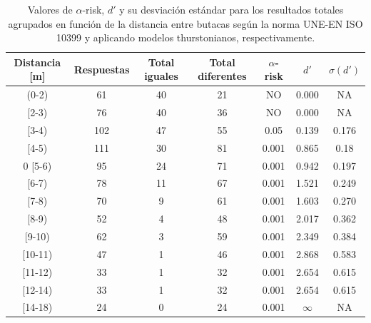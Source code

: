 \documentclass[11pt,a4paper]{book}
\begin{document}
            \begin{table}[H]
			\begin{center}
			\begin{scriptsize}
			\begin{tabular}{| c | c | c | c || c | c | c |}
			    \hline
				\textbf{Distancia [m]}&\textbf{Respuestas}&\textbf{Total iguales}&\textbf{Total diferentes}&\textbf{$\alpha$-risk}&\textbf{$d'$}&\textbf{$\sigma (d')$}\\ \hline
                (0-2)&61&40&21&NO&0.000&NA\\ \hline
                [2-3)&76&40&36&NO&0.000&NA\\ \hline
                [3-4)&102&47&55&0.05&0.139&0.176\\ \hline
                [4-5)&111&30&81&0.001&0.865&0.18\\ \hline0
                [5-6)&95&24&71&0.001&0.942&0.197\\ \hline
                [6-7)&78&11&67&0.001&1.521&0.249\\ \hline
                [7-8)&70&9&61&0.001&1.603&0.270\\ \hline
                [8-9)&52&4&48&0.001&2.017&0.362\\ \hline
                [9-10)&62&3&59&0.001&2.349&0.384\\ \hline
                [10-11)&47&1&46&0.001&2.868&0.583\\ \hline
                [11-12)&33&1&32&0.001&2.654&0.615\\ \hline
                [12-14)&33&1&32&0.001&2.654&0.615\\ \hline
                [14-18)&24&0&24&0.001&$\infty$&NA\\ \hline
			\end{tabular}
			\caption{Valores de $\alpha$-risk, $d'$ y su desviación estándar para los resultados totales agrupados en función de la distancia entre butacas según la norma UNE-EN ISO 10399 y aplicando modelos thurstonianos, respectivamente.}
			\label{tablaButacasDuda}
			\end{scriptsize}
			\end{center}	
		    \end{table}
		    
\end{document}
